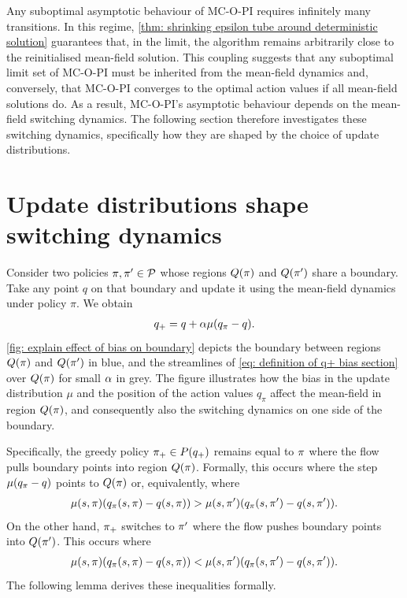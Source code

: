 Any suboptimal asymptotic behaviour of MC-O-PI requires infinitely many transitions. In this regime, \autoref{thm: shrinking epsilon tube around deterministic solution} guarantees that, in the limit, the algorithm remains arbitrarily close to the reinitialised mean-field solution.
This coupling suggests that any suboptimal limit set of MC-O-PI must be inherited from the mean-field dynamics and, conversely, that MC-O-PI converges to the optimal action values if all mean-field solutions do.
As a result, MC-O-PI's asymptotic behaviour depends on the mean-field switching dynamics.
The following section therefore investigates these switching dynamics,
specifically how they are shaped by the choice of update distributions.


\section{Update distributions shape switching dynamics}
\label{sec: update bias control behaviour}


Consider two policies $\pi, \pi' \in \mathcal{P}$ whose regions $Q(\pi)$ and $Q(\pi')$ share a boundary.
Take any point $q$ on that boundary and update it using the mean-field dynamics under policy $\pi$. We obtain
\begin{align}
\label{eq: definition of q+ bias section}
    q_+ 
    =
    q + \alpha \mu (q_\pi - q) .
\end{align}
\autoref{fig: explain effect of bias on boundary} 
depicts the boundary between regions $Q(\pi)$ and $Q(\pi')$ in blue, and the streamlines of \eqref{eq: definition of q+ bias section} over $Q(\pi)$ for small $\alpha$ in grey.
The figure illustrates how 
the bias in the update distribution $\mu$
and the position of the action values $q_\pi$
affect the mean-field in region $Q(\pi)$, and consequently also the switching dynamics on one side of the boundary.

Specifically, the greedy policy $\pi_+ \in P(q_+)$ remains equal to $\pi$ where the flow pulls boundary points into region $Q(\pi)$.
Formally, this occurs where the step $\mu (q_\pi - q)$ points to $Q(\pi)$ or, equivalently, where
\begin{align*}
    \mu(s, \pi) ( q_{\pi}(s, \pi) - q(s, \pi) ) 
    >
    \mu(s, \pi') ( q_{\pi}(s, \pi') - q(s, \pi') ) .
\end{align*}
On the other hand, $\pi_+$ switches to $\pi'$ where the flow pushes boundary points into $Q(\pi')$.
This occurs where
\begin{align*}
    \mu(s, \pi) ( q_{\pi}(s, \pi) - q(s, \pi) ) 
    <
    \mu(s, \pi') ( q_{\pi}(s, \pi') - q(s, \pi') ) .
\end{align*}
The following lemma derives these inequalities formally.

